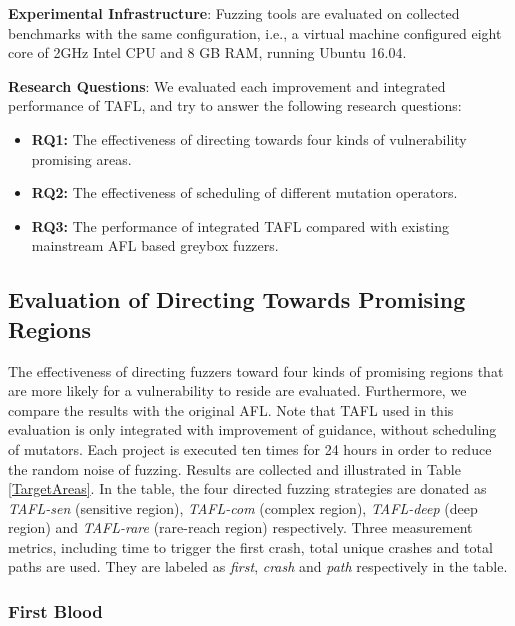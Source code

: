 \textbf{Experimental Infrastructure}: Fuzzing tools are evaluated on collected benchmarks with the same configuration, i.e., a virtual machine configured eight core of 2GHz Intel CPU and 8 GB RAM, running Ubuntu 16.04.


\textbf{Research Questions}: We evaluated each improvement and integrated performance of TAFL, and try to answer the following research questions:

\begin{itemize}

    \item \textbf{RQ1:} The effectiveness of directing towards four kinds of vulnerability promising areas.
    
    \item \textbf{RQ2:} The effectiveness of scheduling of different mutation operators.
    
    \item \textbf{RQ3:} The performance of integrated TAFL compared with existing mainstream AFL based greybox fuzzers.
    
\end{itemize}



\subsection{Evaluation of Directing Towards Promising Regions}
\label{sec:directing}
The effectiveness of directing fuzzers toward four kinds of promising regions that are more likely for a vulnerability to reside are evaluated. Furthermore, we compare the results with the  original AFL. Note that TAFL used in this evaluation is only integrated with improvement of guidance, without scheduling of mutators. Each project is executed ten times for 24 hours in order to reduce the random noise of fuzzing. Results are collected and illustrated in Table \ref{TargetAreas}. 
In the table, the four directed fuzzing strategies are donated as \textit{TAFL-sen} (sensitive region),  \textit{TAFL-com} (complex region), \textit{TAFL-deep}  (deep region) and \textit{TAFL-rare}  (rare-reach region) respectively.
Three measurement metrics, including time to trigger the first crash, total unique crashes and total paths are used. They are labeled as \textit{first}, \textit{crash} and \textit{path} respectively in the table.
\subsubsection{First Blood }

